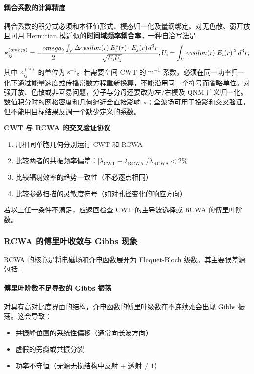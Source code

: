 \paragraph{耦合系数的计算精度}
耦合系数的积分式必须和本征值形式、模态归一化及量纲绑定。对无色散、弱开放且可用 Hermitian 模近似的\textbf{时间域频率耦合率}，一种自洽写法是
\begin{equation}
\kappa_{ij}^{(\omega)}
=-\frac{\omega_0}{2}
\frac{\int_V \Delta\varepsilon(\rvec)\,\E_i^*(\rvec)\cdot\E_j(\rvec)\,\dd^3 r}
{\sqrt{U_iU_j}},
\qquad
U_i=\int_V\varepsilon(\rvec)|\E_i(\rvec)|^2\,\dd^3r,
\label{eq:cwt_coupling_integral}
\end{equation}
其中 $\kappa_{ij}^{(\omega)}$ 的单位为 $\mathrm{s}^{-1}$。若需要空间 CWT 的 $\mathrm{m}^{-1}$ 系数，必须在同一功率归一化下通过能量速度或传播常数方程重新换算，不能沿用同一个符号而省略单位。对强开放、色散或非互易问题，分子与分母还要改为左/右模及 QNM 广义归一化。数值积分时的网格密度和几何逼近会直接影响 $\kappa$；全波场可用于投影和交叉验证，但不能用目标结果反调一个缺少定义的系数。

\begin{CrossValidationBox}
\textbf{CWT 与 RCWA 的交叉验证协议}
\begin{enumerate}
  \item 用相同单胞几何分别运行 CWT 和 RCWA
  \item 比较两者的共振频率偏差：$|\lambda_{\text{CWT}}-\lambda_{\text{RCWA}}|/\lambda_{\text{RCWA}} < 2\%$
  \item 比较辐射效率的趋势一致性（不必逐点相同）
  \item 比较参数扫描的灵敏度符号（如对孔径变化的响应方向）
\end{enumerate}
若以上任一条件不满足，应返回检查 CWT 的主导波选择或 RCWA 的傅里叶阶数。
\end{CrossValidationBox}

\subsubsection{RCWA 的傅里叶收敛与 Gibbs 现象}
RCWA 的核心是将电磁场和介电函数展开为 Floquet-Bloch 级数。其主要误差源包括：

\paragraph{傅里叶阶数不足导致的 Gibbs 振荡}
对具有高对比度界面的结构，介电函数的傅里叶级数在不连续处会出现 Gibbs 振荡。这会导致：
\begin{itemize}
  \item 共振峰位置的系统性偏移（通常向长波方向）
  \item 虚假的旁瓣或共振分裂
  \item 功率不守恒（无源无损结构中反射 + 透射$\neq 1$）
\end{itemize}

